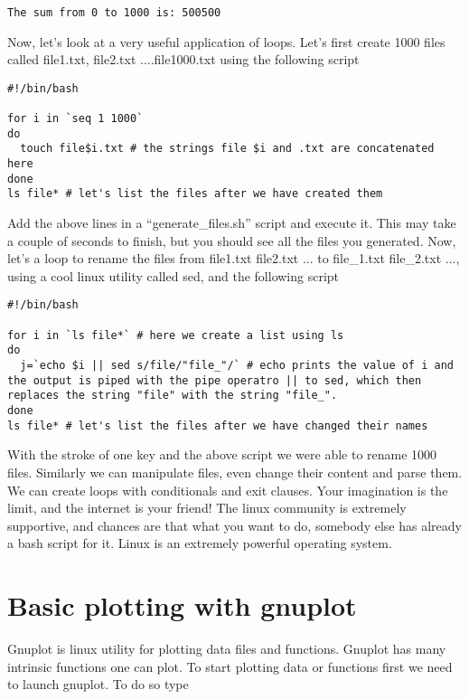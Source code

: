 \documentclass[aps,showpacs,prd,notitlepage,preprintnumbers,amsmath,amssymb,letterpaper]{revtex4}
\begin{document}
\begin{verbatim}
The sum from 0 to 1000 is: 500500
\end{verbatim}

Now, let's look at a very useful application of loops. Let's first
create 1000 files called file1.txt, file2.txt ....file1000.txt using the following script

\begin{verbatim}
#!/bin/bash

for i in `seq 1 1000`
do
  touch file$i.txt # the strings file $i and .txt are concatenated here
done
ls file* # let's list the files after we have created them 
\end{verbatim}

Add the above lines in a ``generate\_files.sh'' script and execute it.
This may take a couple of seconds to finish, but you should see all
the files you generated. Now, let's a loop to rename the files from
file1.txt file2.txt ... to file\_1.txt file\_2.txt ..., using a cool
linux utility called sed, and the following script

\begin{verbatim}
#!/bin/bash

for i in `ls file*` # here we create a list using ls
do
  j=`echo $i || sed s/file/"file_"/` # echo prints the value of i and the output is piped with the pipe operatro || to sed, which then replaces the string "file" with the string "file_".
done
ls file* # let's list the files after we have changed their names
\end{verbatim}

With the stroke of one key and the above script we were able to rename
1000 files. Similarly we can manipulate files, even change their
content and parse them. We can create loops with conditionals and exit
clauses. Your imagination is the limit, and the internet is your
friend! The linux community is extremely supportive, and chances are
that what you want to do, somebody else has already a bash script for
it. Linux is an extremely powerful operating system.


\section{Basic plotting with gnuplot}

Gnuplot is linux utility for plotting data files and functions. Gnuplot
has many intrinsic functions one can plot. To start plotting data or
functions first we need to launch gnuplot. To do so type
\end{document}
